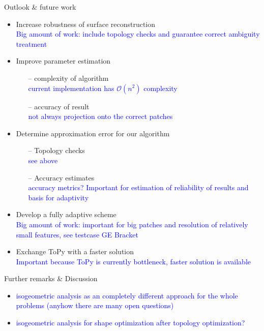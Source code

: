 \begin{frame}{Outlook \& future work}
\begin{itemize}
\item Increase robustness of surface reconstruction \\
{\footnotesize \textcolor{blue}{Big amount of work: include topology checks and guarantee correct ambiguity treatment}}
\item Improve parameter estimation
\begin{itemize}
\item[--] complexity of algorithm \\ {\footnotesize \textcolor{blue}{current implementation has $\mathcal{O}\left(n^2\right)$ complexity}}
\item[--] accuracy of result \\ {\footnotesize \textcolor{blue}{not always projection onto the correct patches}}
\end{itemize}
\item Determine approximation error for our algorithm
\begin{itemize}
\item[--] Topology checks\\ {\footnotesize \textcolor{blue}{see above}}
\item[--] Accuracy estimates\\ {\footnotesize \textcolor{blue}{accuracy metrics? Important for estimation of reliability of results and basis for adaptivity}}
\end{itemize}
\item Develop a fully adaptive scheme \\ {\footnotesize \textcolor{blue}{Big amount of work: important for big patches and resolution of relatively small features, see testcase GE Bracket}}
\item Exchange ToPy with a faster solution \\ {\footnotesize \textcolor{blue}{Important because ToPy is currently bottleneck, faster solution is available}}
\end{itemize}
\end{frame}
\begin{frame}{Further remarks \& Discussion}
\begin{itemize}
\item \textcolor{blue}{isogeometric analysis as an completely different approach for the whole problems (anyhow there are many open questions)}
\item \textcolor{blue}{isogeometric analysis for shape optimization after topology optimization?}
\end{itemize}
\end{frame}


